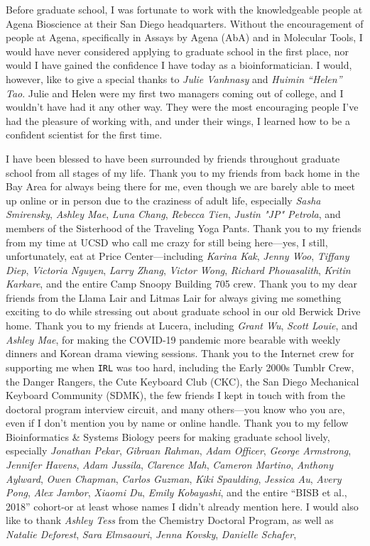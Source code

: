 \documentclass[11pt]{formatting-template}
\begin{document}
\begin{acknowledgements}
	Before graduate school, I was fortunate to work with the knowledgeable people at Agena Bioscience at their San Diego headquarters. Without the encouragement of people at Agena, specifically in Assays by Agena (AbA) and in Molecular Tools, I would have never considered applying to graduate school in the first place, nor would I have gained the confidence I have today as a bioinformatician. I would, however, like to give a special thanks to \textit{Julie Vanhnasy} and \textit{Huimin “Helen” Tao}. Julie and Helen were my first two managers coming out of college, and I wouldn't have had it any other way. They were the most encouraging people I've had the pleasure of working with, and under their wings, I learned how to be a confident scientist for the first time.
	
	I have been blessed to have been surrounded by friends throughout graduate school from all stages of my life. Thank you to my friends from back home in the Bay Area for always being there for me, even though we are barely able to meet up online or in person due to the craziness of adult life, especially \textit{Sasha Smirensky}, \textit{Ashley Mae}, \textit{Luna Chang}, \textit{Rebecca Tien}, \textit{Justin "JP" Petrola}, and members of the Sisterhood of the Traveling Yoga Pants. Thank you to my friends from my time at UCSD who call me crazy for still being here—yes, I still, unfortunately, eat at Price Center—including \textit{Karina Kak}, \textit{Jenny Woo}, \textit{Tiffany Diep}, \textit{Victoria Nguyen}, \textit{Larry Zhang}, \textit{Victor Wong}, \textit{Richard Phouasalith}, \textit{Kritin Karkare}, and the entire Camp Snoopy Building 705 crew. Thank you to my dear friends from the Llama Lair and Litmas Lair for always giving me something exciting to do while stressing out about graduate school in our old Berwick Drive home. Thank you to my friends at Lucera, including \textit{Grant Wu}, \textit{Scott Louie}, and \textit{Ashley Mae}, for making the COVID-19 pandemic more bearable with weekly dinners and Korean drama viewing sessions. Thank you to the Internet crew for supporting me when \verb|IRL| was too hard, including the Early 2000s Tumblr Crew, the Danger Rangers, the Cute Keyboard Club (CKC), the San Diego Mechanical Keyboard Community (SDMK), the few friends I kept in touch with from the doctoral program interview circuit, and many others—you know who you are, even if I don't mention you by name or online handle. Thank you to my fellow Bioinformatics \& Systems Biology peers for making graduate school lively, especially \textit{Jonathan Pekar}, \textit{Gibraan Rahman}, \textit{Adam Officer}, \textit{George Armstrong}, \textit{Jennifer Havens}, \textit{Adam Jussila}, \textit{Clarence Mah}, \textit{Cameron Martino}, \textit{Anthony Aylward}, \textit{Owen Chapman}, \textit{Carlos Guzman}, \textit{Kiki Spaulding}, \textit{Jessica Au}, \textit{Avery Pong}, \textit{Alex Jambor}, \textit{Xiaomi Du}, \textit{Emily Kobayashi}, and the entire “BISB et al., 2018” cohort-or at least whose names I didn't already mention here. I would also like to thank \textit{Ashley Tess} from the Chemistry Doctoral Program, as well as \textit{Natalie Deforest}, \textit{Sara Elmsaouri}, \textit{Jenna Kovsky}, \textit{Danielle Schafer}, 
\end{acknowledgements}
\end{document}
